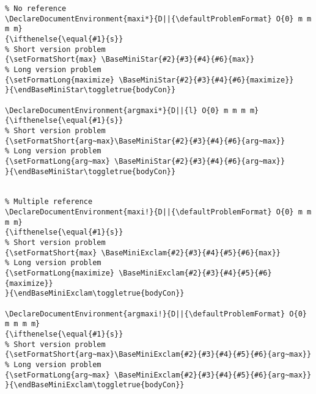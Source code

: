 \documentclass[a4paper]{article}
\begin{document}
\begin{lstlisting}
% No reference
\DeclareDocumentEnvironment{maxi*}{D||{\defaultProblemFormat} O{0} m m m m}
{\ifthenelse{\equal{#1}{s}}
% Short version problem
{\setFormatShort{max} \BaseMiniStar{#2}{#3}{#4}{#6}{max}}
% Long version problem	
{\setFormatLong{maximize} \BaseMiniStar{#2}{#3}{#4}{#6}{maximize}}
}{\endBaseMiniStar\toggletrue{bodyCon}}

\DeclareDocumentEnvironment{argmaxi*}{D||{l} O{0} m m m m}
{\ifthenelse{\equal{#1}{s}}
% Short version problem
{\setFormatShort{arg~max}\BaseMiniStar{#2}{#3}{#4}{#6}{arg~max}}
% Long version problem	
{\setFormatLong{arg~max} \BaseMiniStar{#2}{#3}{#4}{#6}{arg~max}}
}{\endBaseMiniStar\toggletrue{bodyCon}}


% Multiple reference
\DeclareDocumentEnvironment{maxi!}{D||{\defaultProblemFormat} O{0} m m m m}
{\ifthenelse{\equal{#1}{s}}
% Short version problem
{\setFormatShort{max} \BaseMiniExclam{#2}{#3}{#4}{#5}{#6}{max}}
% Long version problem	
{\setFormatLong{maximize} \BaseMiniExclam{#2}{#3}{#4}{#5}{#6}{maximize}}
}{\endBaseMiniExclam\toggletrue{bodyCon}}

\DeclareDocumentEnvironment{argmaxi!}{D||{\defaultProblemFormat} O{0} m m m m}
{\ifthenelse{\equal{#1}{s}}
% Short version problem
{\setFormatShort{arg~max}\BaseMiniExclam{#2}{#3}{#4}{#5}{#6}{arg~max}}
% Long version problem	
{\setFormatLong{arg~max} \BaseMiniExclam{#2}{#3}{#4}{#5}{#6}{arg~max}}
}{\endBaseMiniExclam\toggletrue{bodyCon}}
\end{lstlisting}
\end{document}
